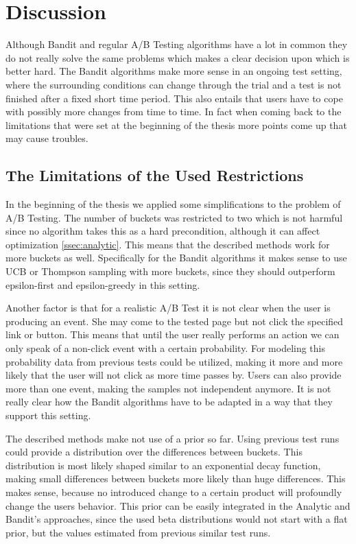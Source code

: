 \documentclass[main.tex]{subfiles}
\begin{document}
\chapter{Discussion}
Although Bandit and regular A/B Testing algorithms have a lot in common they do not really solve the same problems which makes a clear decision upon which is better hard. The Bandit algorithms make more sense in an ongoing test setting, where the surrounding conditions can change through the trial and a test is not finished after a fixed short time period. This also entails that users have to cope with possibly more changes from time to time. In fact when coming back to the limitations that were set at the beginning of the thesis more points come up that may cause troubles.

\section{The Limitations of the Used Restrictions}
In the beginning of the thesis we applied some simplifications to the problem of A/B Testing. The number of buckets was restricted to two which is not harmful since no algorithm takes this as a hard precondition, although it can affect optimization \ref{ssec:analytic}. This means that the described methods work for more buckets as well. Specifically for the Bandit algorithms it makes sense to use UCB or Thompson sampling with more buckets, since they should outperform epsilon-first and epsilon-greedy in this setting.

Another factor is that for a realistic A/B Test it is not clear when the user is producing an event. She may come to the tested page but not click the specified link or button. This means that until the user really performs an action we can only speak of a non-click event with a certain probability. For modeling this probability data from previous tests could be utilized, making it more and more likely that the user will not click as more time passes by. Users can also provide more than one event, making the samples not independent anymore. It is not really clear how the Bandit algorithms have to be adapted in a way that they support this setting.

The described methods make not use of a prior so far. Using previous test runs could provide a distribution over the differences between buckets. This distribution is most likely shaped similar to an exponential decay function, making small differences between buckets more likely than huge differences. This makes sense, because no introduced change to a certain product will profoundly change the users behavior. This prior can be easily integrated in the Analytic and Bandit's approaches, since the used beta distributions would not start with a flat prior, but the values estimated from previous similar test runs.
\end{document}
